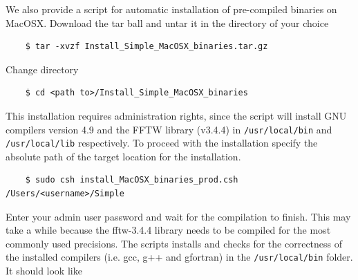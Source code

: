 \documentclass[a4paper,11pt]{article}
\begin{document}
We also provide a script for automatic installation of pre-compiled binaries on MacOSX. Download the tar ball and untar it in the directory of your choice 
\begin{verbatim}
    $ tar -xvzf Install_Simple_MacOSX_binaries.tar.gz
\end{verbatim}
Change directory 
\begin{verbatim}
    $ cd <path to>/Install_Simple_MacOSX_binaries
\end{verbatim}
This installation requires administration rights, since the script will install GNU compilers version 4.9 and the FFTW library (v3.4.4) in \texttt{/usr/local/bin} and \texttt{/usr/local/lib} respectively. To proceed with the installation specify the absolute path of the target location for the installation.
\begin{verbatim}
    $ sudo csh install_MacOSX_binaries_prod.csh /Users/<username>/Simple
\end{verbatim}
Enter your admin user password and wait for the compilation to finish. This may take a while because the fftw-3.4.4 library needs to be compiled for the most commonly used precisions. The scripts installs and checks for the correctness of the installed compilers (i.e. gcc, g++ and gfortran) in the \texttt{/usr/local/bin} folder. It
should look like
\end{document}
